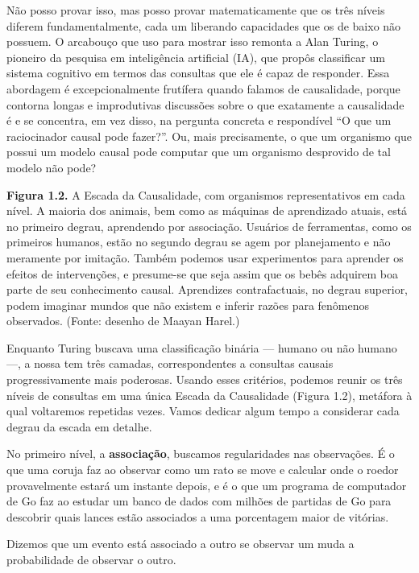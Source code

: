 \documentclass[11pt,a5paper,twoside]{book}
\begin{document}
Não posso provar isso, mas posso provar matematicamente que os três níveis diferem fundamentalmente, cada um liberando capacidades que os de baixo não possuem. O arcabouço que uso para mostrar isso remonta a Alan Turing, o pioneiro da pesquisa em inteligência artificial (IA), que propôs classificar um sistema cognitivo em termos das consultas que ele é capaz de responder. Essa abordagem é excepcionalmente frutífera quando falamos de causalidade, porque contorna longas e improdutivas discussões sobre o que exatamente a causalidade é e se concentra, em vez disso, na pergunta concreta e respondível “O que um raciocinador causal pode fazer?”. Ou, mais precisamente, o que um organismo que possui um modelo causal pode computar que um organismo desprovido de tal modelo não pode?

\textbf{Figura 1.2.} A Escada da Causalidade, com organismos representativos em cada nível. A maioria dos animais, bem como as máquinas de aprendizado atuais, está no primeiro degrau, aprendendo por associação. Usuários de ferramentas, como os primeiros humanos, estão no segundo degrau se agem por planejamento e não meramente por imitação. Também podemos usar experimentos para aprender os efeitos de intervenções, e presume-se que seja assim que os bebês adquirem boa parte de seu conhecimento causal. Aprendizes contrafactuais, no degrau superior, podem imaginar mundos que não existem e inferir razões para fenômenos observados. (Fonte: desenho de Maayan Harel.)

Enquanto Turing buscava uma classificação binária — humano ou não humano —, a nossa tem três camadas, correspondentes a consultas causais progressivamente mais poderosas. Usando esses critérios, podemos reunir os três níveis de consultas em uma única Escada da Causalidade (Figura 1.2), metáfora à qual voltaremos repetidas vezes. Vamos dedicar algum tempo a considerar cada degrau da escada em detalhe.

No primeiro nível, a \textbf{associação}, buscamos regularidades nas observações. É o que uma coruja faz ao observar como um rato se move e calcular onde o roedor provavelmente estará um instante depois, e é o que um programa de computador de Go faz ao estudar um banco de dados com milhões de partidas de Go para descobrir quais lances estão associados a uma porcentagem maior de vitórias.

Dizemos que um evento está associado a outro se observar um muda a probabilidade de observar o outro.
\end{document}
